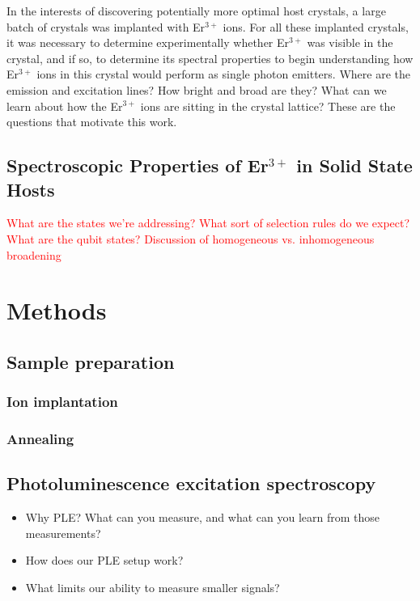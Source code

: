 \documentclass[12pt]{puthesis}
\newcommand{\erbium}[1][ ]{Er$^{3+}$#1}
\newcommand{\notetoself}[1]{\textcolor{red}{#1}}
\begin{document}
In the interests of discovering potentially more optimal host crystals, a large batch of crystals was implanted with \erbium ions. For all these implanted crystals, it was necessary to determine experimentally whether \erbium was visible in the crystal, and if so, to determine its spectral properties to begin understanding how \erbium ions in this crystal would perform as single photon emitters. Where are the emission and excitation lines? How bright and broad are they? What can we learn about how the \erbium ions are sitting in the crystal lattice? These are the questions that motivate this work.

\section{Spectroscopic Properties of \erbium in Solid State Hosts}
\label{sec:spectr-prop-erbi}

\notetoself{What are the states we're addressing? What sort of selection rules do we expect? What are the qubit states? Discussion of homogeneous vs. inhomogeneous broadening }




\chapter{Methods}

\section{Sample preparation}
\label{sec:sample-preparation}

\subsection{Ion implantation}
\label{sec:ion-implantation}

\subsection{Annealing}
\label{sec:annealing}

\section{Photoluminescence excitation spectroscopy}
\label{sec:phot-excit-spectr}

\begin{itemize}
\item Why PLE? What can you measure, and what can you learn from those measurements?

\item How does our PLE setup work?

\item What limits our ability to measure smaller signals?
\end{itemize}
\end{document}
